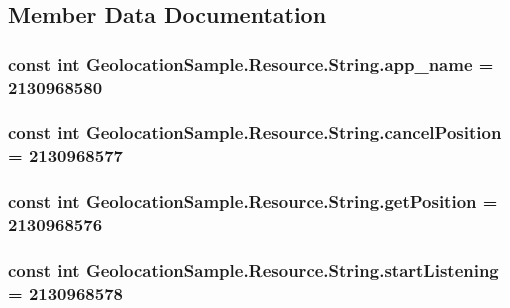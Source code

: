 \subsection{Member Data Documentation}
\hypertarget{class_geolocation_sample_1_1_resource_1_1_string_a327048e7930588e8a97c55222d0959e5}{
\subsubsection[{app\+\_\+name}]{\setlength{\rightskip}{0pt plus 5cm}const int Geolocation\+Sample.\+Resource.\+String.\+app\+\_\+name = 2130968580}}\label{class_geolocation_sample_1_1_resource_1_1_string_a327048e7930588e8a97c55222d0959e5}
\hypertarget{class_geolocation_sample_1_1_resource_1_1_string_ab443de0f81a6cebfb1a6b7cfc08d7252}{
\subsubsection[{cancel\+Position}]{\setlength{\rightskip}{0pt plus 5cm}const int Geolocation\+Sample.\+Resource.\+String.\+cancel\+Position = 2130968577}}\label{class_geolocation_sample_1_1_resource_1_1_string_ab443de0f81a6cebfb1a6b7cfc08d7252}
\hypertarget{class_geolocation_sample_1_1_resource_1_1_string_a54fb35b04d2310af765de60c2853254b}{
\subsubsection[{get\+Position}]{\setlength{\rightskip}{0pt plus 5cm}const int Geolocation\+Sample.\+Resource.\+String.\+get\+Position = 2130968576}}\label{class_geolocation_sample_1_1_resource_1_1_string_a54fb35b04d2310af765de60c2853254b}
\hypertarget{class_geolocation_sample_1_1_resource_1_1_string_a08fed6ff6a2847cf28bfefdd2efa3626}{
\subsubsection[{start\+Listening}]{\setlength{\rightskip}{0pt plus 5cm}const int Geolocation\+Sample.\+Resource.\+String.\+start\+Listening = 2130968578}}\label{class_geolocation_sample_1_1_resource_1_1_string_a08fed6ff6a2847cf28bfefdd2efa3626}
